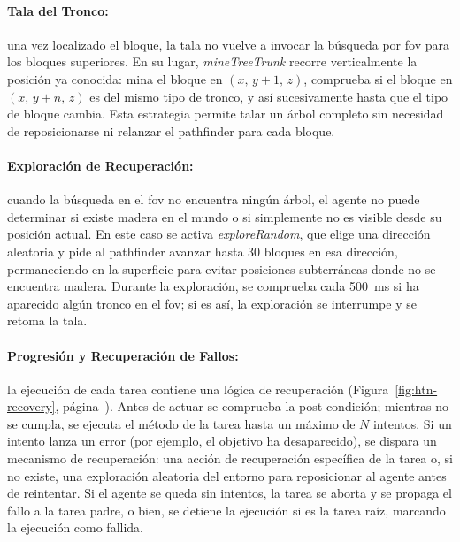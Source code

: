 \paragraph{Tala del Tronco:}
una vez localizado el bloque, la tala no vuelve a invocar
la búsqueda por \gls{fov} para los bloques superiores. En su lugar,
\textit{mineTreeTrunk} recorre verticalmente la posición
ya conocida: mina el bloque en $(x,\,y{+}1,\,z)$, comprueba si el bloque
en $(x,\,y{+}n,\,z)$ es del mismo tipo de tronco, y así sucesivamente hasta
que el tipo de bloque cambia. Esta estrategia permite talar un árbol completo
sin necesidad de reposicionarse ni relanzar el \gls{pathfinder} para cada bloque.

\paragraph{Exploración de Recuperación:}
cuando la búsqueda en el \gls{fov} no encuentra ningún árbol,
el agente no puede determinar si existe madera en el mundo o si simplemente no
es visible desde su posición actual. En este caso se activa \textit{exploreRandom},
que elige una dirección aleatoria y pide al \gls{pathfinder} avanzar hasta \num{30} bloques
en esa dirección, permaneciendo en la superficie
para evitar posiciones subterráneas donde no se encuentra madera. Durante la exploración, se
comprueba cada \qty{500}{ms} si ha aparecido algún tronco en el \gls{fov}; si es así, la
exploración se interrumpe y se retoma la tala.

\paragraph{Progresión y Recuperación de Fallos:}
la ejecución de cada tarea contiene una 
lógica de recuperación (Figura~\ref{fig:htn-recovery}, página~\pageref{fig:htn-recovery}). 
Antes de actuar se comprueba la post-condición;
mientras no se cumpla, se ejecuta el método de la tarea hasta un máximo de $N$
intentos. Si un intento lanza un error (por ejemplo, el objetivo ha desaparecido), 
se dispara un mecanismo de recuperación: una acción de recuperación
específica de la tarea o, si no existe, una exploración aleatoria del entorno
para reposicionar al agente antes de reintentar. 
Si el agente se queda sin intentos, la tarea se aborta y se propaga el fallo a la tarea padre,
o bien, se detiene la ejecución si es la tarea raíz, marcando la ejecución como fallida.

